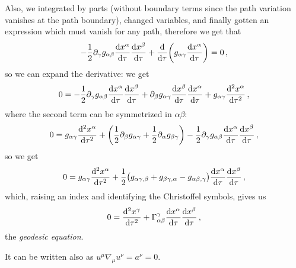 \documentclass[main.tex]{subfiles}
\begin{document}
Also, we integrated by parts (without boundary terms since the path variation vanishes at the path boundary), changed variables, and finally gotten an expression which must vanish for any path, therefore we get that 
%
\begin{align}
    -\frac{1}{2} \partial_{\gamma }g_{\alpha \beta } \dv{x^{\alpha }}{\tau } \dv{x^{\beta }}{\tau } 
    + \dv{}{\tau } \qty(g_{\alpha \gamma } \dv{x^{\alpha }}{\tau }) = 0
\,,
\end{align}
%
so we can expand the derivative: we get 
%
\begin{align}
  0= - \frac{1}{2} \partial_{\gamma }g_{\alpha \beta } \dv{x^{\alpha }}{\tau } \dv{x^{\beta }}{\tau } + 
  \partial_{\beta }g_{\alpha \gamma } \dv{x^{\beta }}{\tau } \dv{x^{\alpha }}{\tau } + g_{\alpha \gamma } \dv[2]{x^{\alpha }}{\tau }
\,,
\end{align}
%
where the second term can be symmetrized in \(\alpha \beta \): 
%
\begin{align}
  0= g_{\alpha \gamma } \dv[2]{x^{\alpha }}{\tau } +
  \qty(\frac{1}{2} \partial_{\beta }g_{\alpha \gamma } + \frac{1}{2}\partial_{\alpha } g_{\beta \gamma }) - \frac{1}{2}\partial_{\gamma }g_{\alpha \beta } \dv{x^{\alpha }}{\tau } \dv{x^{\beta }}{\tau }
\,,
\end{align}
%
so we get 
%
\begin{align}
  0= g_{\alpha \gamma } \dv[2]{x^{\alpha }}{\tau } +
  \frac{1}{2}\qty(g_{\alpha \gamma , \beta } + g_{\beta \gamma , \alpha } - g_{\alpha \beta , \gamma })
  \dv{x^{\alpha }}{\tau } \dv{x^{\beta }}{\tau }
\,,
\end{align}
%
which, raising an index and identifying the Christoffel symbols, gives us 
%
\begin{align}
  0 = \dv[2]{x^{\gamma }}{\tau } + \Gamma^{\gamma }_{\alpha \beta } \dv{x^{\alpha }}{\tau } \dv{x^{\beta }}{\tau }
\,,
\end{align}
%
the \emph{geodesic equation}.

It can be written also as \(u^{\mu } \nabla_{\mu }u^{\nu } = a^{\nu } = 0\).
\end{document}
